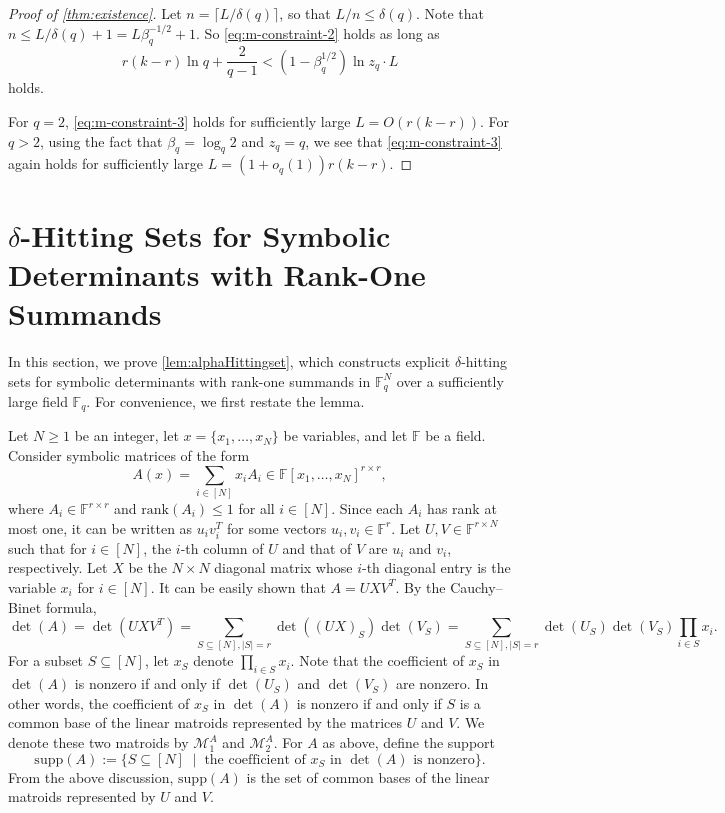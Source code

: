\documentclass[11pt]{article}
\newcommand{\rank}{\mathrm{rank}}
\newcommand{\F}{\mathbb{F}}
\newcommand{\supp}{\mathrm{supp}}
\begin{document}
\begin{proof}[Proof of \cref{thm:existence}]
Let $n=\lceil L/\delta(q)\rceil$, so that $L/n\leq \delta(q)$. Note that $n\leq L/\delta(q)+1=L\beta_q^{-1/2}+1$. So \eqref{eq:m-constraint-2} holds as long as
\begin{equation}\label{eq:m-constraint-3}
r(k-r)\ln q+\frac{2}{q-1}< (1-\beta_q^{1/2}) \ln z_q \cdot L
\end{equation}
holds.

For $q=2$, \eqref{eq:m-constraint-3} holds for sufficiently large $L=O(r(k-r))$.
For $q>2$, using the fact that $\beta_q=\log_q 2$ and $z_q=q$, we see that \eqref{eq:m-constraint-3} again holds for sufficiently large $L=(1+o_q(1))r(k-r)$.
\end{proof}


\section{$\delta$-Hitting Sets for Symbolic Determinants with Rank-One Summands}
\label{sec:hittingsetVBP1}

In this section, we prove \cref{lem:alphaHittingset}, which constructs explicit $\delta$-hitting sets for symbolic determinants with rank-one summands in $\F_q^N$ over a sufficiently large field $\F_q$. For convenience, we first restate the lemma.


Let $N\geq 1$ be an integer, let $x=\{x_1,\dots,x_N\}$ be variables, and let $\F$ be a field. 
Consider symbolic matrices of the form
\[
A(x)=\sum_{i\in [N]} x_i A_i\in\F[x_1,\dots,x_N]^{r\times r},
\]
where $A_i\in \F^{r\times r}$ and $\rank(A_i)\leq 1$ for all $i\in [N]$. Since each $A_i$ has rank at most one, it can be written as $u_iv_i^T$ for some vectors $u_i,v_i\in \F^r$. Let $U,V\in \F^{r\times N}$ such that for $i\in [N]$, the $i$-th column of $U$ and that of $V$ are $u_i$ and $v_i$, respectively. Let $X$ be the $N\times N$ diagonal matrix whose $i$-th diagonal entry is the variable $x_i$ for $i\in [N]$. It can be easily shown that $A=UXV^T$. By the Cauchy--Binet formula,
\[
\det(A)=\det(UXV^T)=\sum_{S\subseteq [N],|S|=r} \det((UX)_S)\det(V_S)=\sum_{S\subseteq [N],|S|=r} \det(U_S)\det(V_S)\prod_{i\in S}x_i.
\]
For a subset $S\subseteq [N]$, let $x_S$ denote $\prod_{i\in S}x_i$. Note that the coefficient of $x_S$ in $\det(A)$ is nonzero if and only if $\det(U_S)$ and $\det(V_S)$ are nonzero. In other words, the coefficient of $x_S$ in $\det(A)$ is nonzero 
if and only if $S$ is a common base of the linear matroids represented by the matrices $U$ and $V$. We denote these two matroids by $\mathcal{M}^A_1$ and $\mathcal{M}^A_2$.
For $A$ as above, define the support
\[
\supp(A):=\{ S\subseteq [N] \;\mid \; \text{the coefficient of $x_S$ in $\det(A)$ is nonzero} \}.
\]
From the above discussion, $\supp(A)$ is the set of common bases of the linear matroids represented by $U$ and $V$.
\end{document}
